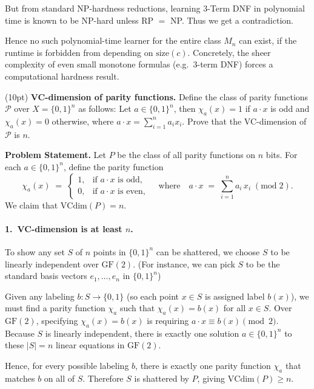\documentclass[11pt]{article}
\DeclareMathOperator{\1}{\mathbbm{1}}
\begin{document}
But from standard NP-hardness reductions, learning 3-Term DNF in polynomial time is known to be NP-hard unless RP $=$ NP.  Thus we get a contradiction.

Hence no such polynomial-time learner for the entire class $M_n$ can exist, if the runtime is forbidden from depending on $\text{size}(c)$.  Concretely, the sheer complexity of even small monotone formulas (e.g.\ 3-term DNF) forces a computational hardness result.

\begin{problem} (10pt) \textbf{VC-dimension of parity functions.}
Define the class of parity functions ${\mathcal P}$ over $X = \{0, 1\}^n$ as
follows: Let $a \in \{0, 1\}^n$, then $\chi_a(x) = 1$ if $a \cdot x$ is odd and
$\chi_a(x) = 0$ otherwise, where $a \cdot x = \sum_{i=1}^n a_i x_i$. Prove that the VC-dimension of ${\mathcal P}$ is $n$. 

\end{problem}

\noindent
\textbf{Problem Statement.}
Let $P$ be the class of all parity functions on $n$ bits.  For each $a \in \{0,1\}^n$, define the parity function
\[
\chi_a(x) \;=\; \begin{cases}
1, & \text{if }a\cdot x \text{ is odd},\\
0, & \text{if }a\cdot x \text{ is even},
\end{cases}
\quad\text{where}\quad
a\cdot x \;=\;\sum_{i=1}^n a_i\,x_i\;(\mathrm{mod}\;2).
\]
We claim that $\mathrm{VCdim}(P) = n$.

\paragraph{1.~VC-dimension is at least $n$.}
To show any set $S$ of $n$ points in $\{0,1\}^n$ can be shattered, we choose $S$ to be linearly independent over $\mathrm{GF}(2)$.  (For instance, we can pick $S$ to be the standard basis vectors $e_1,\dots,e_n$ in $\{0,1\}^n$)

Given any labeling $b:S \to \{0,1\}$ (so each point $x\in S$ is assigned label $b(x)$), we must find a parity function $\chi_a$ such that $\chi_a(x)=b(x)$ for all $x\in S$. Over $\mathrm{GF}(2)$, specifying $\chi_a(x)=b(x)$ is requiring $a\cdot x \equiv b(x)\pmod{2}$. Because $S$ is linearly independent, there is exactly one solution $a\in\{0,1\}^n$ to these $|S|=n$ linear equations in $\mathrm{GF}(2)$.

Hence, for every possible labeling $b$, there is exactly one parity function $\chi_a$ that matches $b$ on all of $S$.  Therefore $S$ is shattered by $P$, giving $\mathrm{VCdim}(P)\ge n$.
\end{document}
